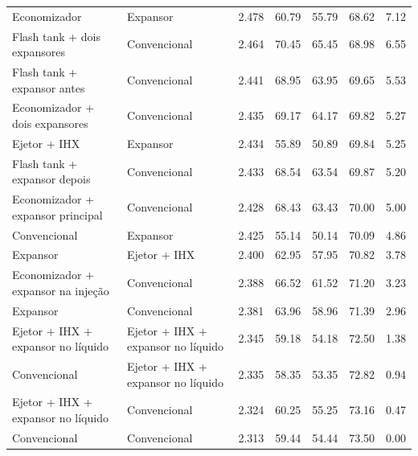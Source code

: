 {\begin{tabular}{llrrrrr}
Economizador & Expansor & 2.478 & 60.79 & 55.79 & 68.62 & 7.12 \\
Flash tank + dois expansores & Convencional & 2.464 & 70.45 & 65.45 & 68.98 & 6.55 \\
Flash tank + expansor antes & Convencional & 2.441 & 68.95 & 63.95 & 69.65 & 5.53 \\
Economizador + dois expansores & Convencional & 2.435 & 69.17 & 64.17 & 69.82 & 5.27 \\
Ejetor + IHX & Expansor & 2.434 & 55.89 & 50.89 & 69.84 & 5.25 \\
Flash tank + expansor depois & Convencional & 2.433 & 68.54 & 63.54 & 69.87 & 5.20 \\
Economizador + expansor principal & Convencional & 2.428 & 68.43 & 63.43 & 70.00 & 5.00 \\
Convencional & Expansor & 2.425 & 55.14 & 50.14 & 70.09 & 4.86 \\
Expansor & Ejetor + IHX & 2.400 & 62.95 & 57.95 & 70.82 & 3.78 \\
Economizador + expansor na injeção & Convencional & 2.388 & 66.52 & 61.52 & 71.20 & 3.23 \\
Expansor & Convencional & 2.381 & 63.96 & 58.96 & 71.39 & 2.96 \\
Ejetor + IHX + expansor no líquido & Ejetor + IHX + expansor no líquido & 2.345 & 59.18 & 54.18 & 72.50 & 1.38 \\
Convencional & Ejetor + IHX + expansor no líquido & 2.335 & 58.35 & 53.35 & 72.82 & 0.94 \\
Ejetor + IHX + expansor no líquido & Convencional & 2.324 & 60.25 & 55.25 & 73.16 & 0.47 \\
Convencional & Convencional & 2.313 & 59.44 & 54.44 & 73.50 & 0.00 \\
\bottomrule
\end{tabular}
}
